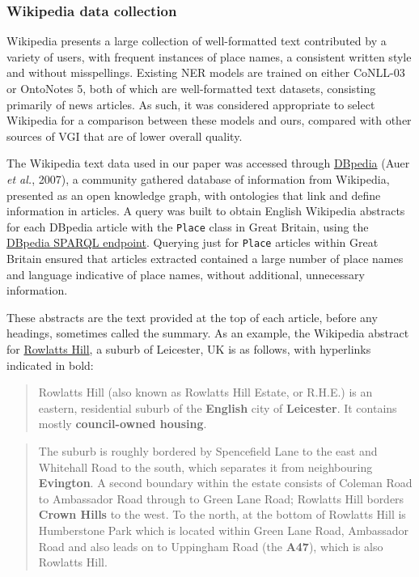 \documentclass[
  letterpaper,
  11pt,
  english,
  onehalfspacing,
  headsepline]{MastersDoctoralThesis}
\begin{document}
\hypertarget{wikipedia-data-collection}{%
\subsubsection{Wikipedia data
collection}\label{wikipedia-data-collection}}

Wikipedia presents a large collection of well-formatted text contributed
by a variety of users, with frequent instances of place names, a
consistent written style and without misspellings. Existing NER models
are trained on either CoNLL-03 or OntoNotes 5, both of which are
well-formatted text datasets, consisting primarily of news articles. As
such, it was considered appropriate to select Wikipedia for a comparison
between these models and ours, compared with other sources of VGI that
are of lower overall quality.

The Wikipedia text data used in our paper was accessed through
\href{https://wiki.dbpedia.org/}{DBpedia} (Auer \emph{et al.}, 2007), a
community gathered database of information from Wikipedia, presented as
an open knowledge graph, with ontologies that link and define
information in articles. A query was built to obtain English Wikipedia
abstracts for each DBpedia article with the \texttt{Place} class in
Great Britain, using the \href{http://dbpedia.org/sparql}{DBpedia SPARQL
endpoint}. Querying just for \texttt{Place} articles within Great
Britain ensured that articles extracted contained a large number of
place names and language indicative of place names, without additional,
unnecessary information.

These abstracts are the text provided at the top of each article, before
any headings, sometimes called the summary. As an example, the Wikipedia
abstract for \href{https://en.wikipedia.org/wiki/Rowlatts_Hill}{Rowlatts
Hill}, a suburb of Leicester, UK is as follows, with hyperlinks
indicated in bold:

\begin{quote}
Rowlatts Hill (also known as Rowlatts Hill Estate, or R.H.E.) is an
eastern, residential suburb of the \textbf{English} city of
\textbf{Leicester}. It contains mostly \textbf{council-owned housing}.
\end{quote}

\begin{quote}
The suburb is roughly bordered by Spencefield Lane to the east and
Whitehall Road to the south, which separates it from neighbouring
\textbf{Evington}. A second boundary within the estate consists of
Coleman Road to Ambassador Road through to Green Lane Road; Rowlatts
Hill borders \textbf{Crown Hills} to the west. To the north, at the
bottom of Rowlatts Hill is Humberstone Park which is located within
Green Lane Road, Ambassador Road and also leads on to Uppingham Road
(the \textbf{A47}), which is also Rowlatts Hill.
\end{quote}
\end{document}
